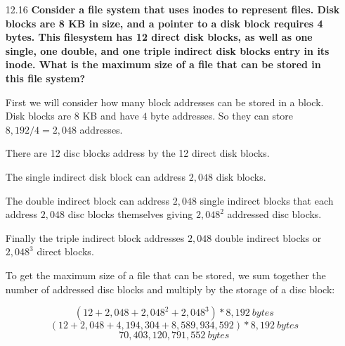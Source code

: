 \documentclass[11pt, letterpaper]{hw}
\begin{document}
\begin{enumerate}
{\it Disadvantages:} If too many writes are performed to an SSD it will wear out its flash blocks. Caching data that a process reads from the magnetic disk will cause many writes to the SSD. Cache eviction polices could be tricky as well. When you want to re-write any page (evicting old data) the entire block the page resides in must be erased. Finally, when the disk is more than $50\%$ utilized the performance begins to fall quickly. They will result in a lot of wasted disk space as you can't use the entire disk as a cache.
 
\item [12.16] \textbf{Consider a file system that uses inodes to represent files. Disk blocks are 8 KB in size, and a pointer to a disk block requires 4 bytes. This filesystem has 12 direct disk blocks, as well as one single, one double, and one triple indirect disk blocks entry in its inode. What is the maximum size of a file that can be stored in this file system?}

First we will consider how many block addresses can be stored in a block. Disk blocks are $8$ KB and have $4$ byte addresses. So they can store $8,192 / 4 = 2,048$ addresses.

There are 12 disc blocks address by the 12 direct disk blocks. 

The single indirect disk block can address $2,048$ disk blocks. 

The double indirect block can address $2,048$ single indirect blocks that each address $2,048$ disc blocks themselves giving $2,048^2$ addressed disc blocks. 

Finally the triple indirect block addresses $2,048$ double indirect blocks or $2,048^3$ direct blocks.

To get the maximum size of a file that can be stored, we sum together the number of addressed disc blocks and multiply by the storage of a disc block:

$$(12 + 2,048 + 2,048^2 + 2,048^3) * 8,192 \ bytes$$
$$(12 + 2,048 + 4,194,304 + 8,589,934,592) * 8,192 \ bytes$$
$$\boxed{70,403,120,791,552 \ bytes}$$
\end{enumerate}
\end{document}
